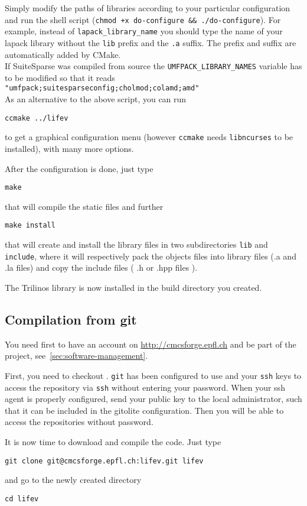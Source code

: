 Simply modify the paths of libraries according to your particular configuration and run the shell script (\verb!chmod +x do-configure && ./do-configure!). For example, instead of \verb!lapack_library_name! you should type the name of your lapack library without the
\verb!lib! prefix and the \verb!.a! suffix. The prefix and suffix are automatically added by CMake.\\
If SuiteSparse was compiled from source the \verb!UMFPACK_LIBRARY_NAMES! variable has to be modified so that it reads \verb!"umfpack;suitesparseconfig;cholmod;colamd;amd"!\\
As an alternative to the above script, you can run
\begin{lstlisting}
ccmake ../lifev
\end{lstlisting}
to get a graphical configuration menu (however \verb!ccmake! needs \verb!libncurses! to be installed), with many more options.

After the configuration is done, just type
\begin{lstlisting}
make
\end{lstlisting}
that  will compile the static files and further
\begin{lstlisting}
make install
\end{lstlisting}
that will create and install the library files
in two subdirectories \verb|lib| and \verb|include|, where
it will respectively pack the objects files into library files (.a and .la files)
and copy the include files ( .h or .hpp files ).

The Trilinos library is now installed in the build directory you created.

\subsection{Compilation from git}
\label{sec:compile-cvs}
You need first to have an account on \url{http://cmcsforge.epfl.ch} and
be part of the \lifev project, see~\ref{sec:software-management}.

First, you need to checkout \lifev. \verb!git! has
been configured to use  and your \verb!ssh! keys to
access the repository via \verb!ssh! without entering your password. When your ssh agent is properly configured,
send your public key to the local administrator, such that it can be included in
the gitolite configuration.
Then you will be able to access the
repositories without password.

It is now time to download and compile the code.
Just type
\begin{lstlisting}
git clone git@cmcsforge.epfl.ch:lifev.git lifev
\end{lstlisting}
and go to the newly created directory
\begin{lstlisting}
cd lifev
\end{lstlisting}

